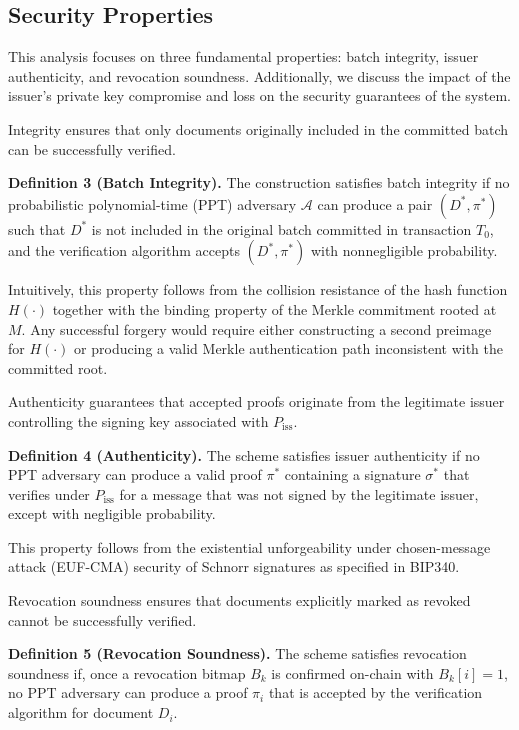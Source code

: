 \documentclass[preprint,12pt]{elsarticle}
\begin{document}
\subsection{Security Properties}

This analysis focuses on three fundamental properties: batch integrity, issuer authenticity, and revocation soundness. Additionally, we discuss the impact of the issuer's private key compromise and loss on the security guarantees of the system.

Integrity ensures that only documents originally included in the committed batch can be successfully verified.

\textbf{Definition 3 (Batch Integrity).}  
The construction satisfies batch integrity if no probabilistic polynomial-time (PPT) adversary $\mathcal{A}$ can produce a pair $(D^*, \pi^*)$ such that $D^*$ is not included in the original batch committed in transaction $T_0$, and the verification algorithm accepts $(D^*, \pi^*)$ with nonnegligible probability.

Intuitively, this property follows from the collision resistance of the hash function $H(\cdot)$ together with the binding property of the Merkle commitment rooted at $M$. Any successful forgery would require either constructing a second preimage for $H(\cdot)$ or producing a valid Merkle authentication path inconsistent with the committed root.

Authenticity guarantees that accepted proofs originate from the legitimate issuer controlling the signing key associated with $P_{\mathrm{iss}}$.

\textbf{Definition 4 (Authenticity).}  
The scheme satisfies issuer authenticity if no PPT adversary can produce a valid proof $\pi^*$ containing a signature $\sigma^*$ that verifies under $P_{\mathrm{iss}}$ for a message that was not signed by the legitimate issuer, except with negligible probability.

This property follows from the existential unforgeability under chosen-message attack (EUF-CMA) security of Schnorr signatures as specified in BIP340.

Revocation soundness ensures that documents explicitly marked as revoked cannot be successfully verified.

\textbf{Definition 5 (Revocation Soundness).}  
The scheme satisfies revocation soundness if, once a revocation bitmap $B_k$ is confirmed on-chain with $B_k[i] = 1$, no PPT adversary can produce a proof $\pi_i$ that is accepted by the verification algorithm for document $D_i$.
\end{document}
